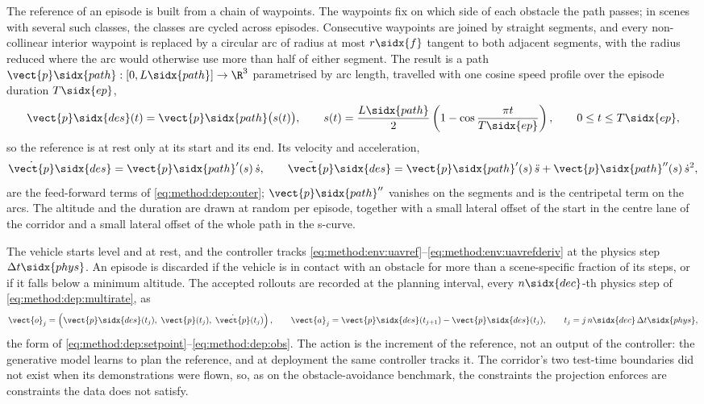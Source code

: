 The reference of an episode is built from a chain of waypoints. The waypoints fix on which side of each
obstacle the path passes; in scenes with several such classes, the classes are cycled across episodes.
Consecutive waypoints are joined by straight segments, and every non-collinear interior waypoint is
replaced by a circular arc of radius at most $r\sidx{f}$ tangent to both adjacent segments, with the
radius reduced where the arc would otherwise use more than half of either segment. The result is a
path $\vect{p}\sidx{path}:[0,L\sidx{path}]\to\R^{3}$ parametrised by arc length, travelled with one cosine
speed profile over the episode duration $T\sidx{ep}$,
\begin{equation}\label{eq:method:env:uavref}
  \vect{p}\sidx{des}(t) = \vect{p}\sidx{path}\big(s(t)\big),
  \qquad
  s(t) = \frac{L\sidx{path}}{2}\left(1-\cos\frac{\pi t}{T\sidx{ep}}\right),
  \qquad 0\le t\le T\sidx{ep},
\end{equation}
so the reference is at rest only at its start and its end. Its velocity and acceleration,
\begin{equation}\label{eq:method:env:uavrefderiv}
  \dot{\vect{p}}\sidx{des} = \vect{p}\sidx{path}'(s)\,\dot{s},
  \qquad
  \ddot{\vect{p}}\sidx{des} = \vect{p}\sidx{path}'(s)\,\ddot{s} + \vect{p}\sidx{path}''(s)\,\dot{s}^{2},
\end{equation}
are the feed-forward terms of \eqref{eq:method:dep:outer}; $\vect{p}\sidx{path}''$ vanishes on the segments
and is the centripetal term on the arcs. The altitude and the duration are drawn at random per
episode, together with a small lateral offset of the start in the centre lane of the corridor and a
small lateral offset of the whole path in the s-curve.

The vehicle starts level and at rest, and the controller tracks
\eqref{eq:method:env:uavref}--\eqref{eq:method:env:uavrefderiv} at the physics step $\Delta t\sidx{phys}$.
An episode is discarded if the vehicle is in contact with an obstacle for more than a scene-specific
fraction of its steps, or if it falls below a minimum altitude. The accepted rollouts are recorded at the
planning interval, every $n\sidx{dec}$-th physics step of \eqref{eq:method:dep:multirate}, as
\begin{equation}\label{eq:method:env:uavdata}
  \vect{o}_{j} = \left(\vect{p}\sidx{des}(t_{j}),\;\vect{p}(t_{j}),\;\dot{\vect{p}}(t_{j})\right),
  \qquad
  \vect{a}_{j} = \vect{p}\sidx{des}(t_{j+1}) - \vect{p}\sidx{des}(t_{j}),
  \qquad
  t_{j} = j\,n\sidx{dec}\,\Delta t\sidx{phys},
\end{equation}
the form of \eqref{eq:method:dep:setpoint}--\eqref{eq:method:dep:obs}. The action is the increment of
the reference, not an output of the controller: the generative model learns to plan the reference,
and at deployment the same controller tracks it. The corridor's two test-time boundaries did not exist
when its demonstrations were flown, so, as on the obstacle-avoidance benchmark, the constraints the
projection enforces are constraints the data does not satisfy.
